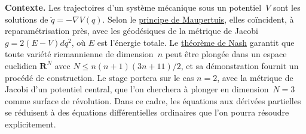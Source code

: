 \documentclass[a4paper,11pt]{article}
\begin{document}
{\bf Contexte.}
Les trajectoires d’un système mécanique sous un potentiel~$V$ sont les
solutions de $\ddot q = -\nabla V(q)$.  Selon le \underline{principe de
Maupertuis}, elles coïncident, à reparamétrisation près, avec les géodésiques
de la métrique de Jacobi $g = 2(E-V)dq^2$, où $E$ est l'énergie totale.
Le \underline{théorème de Nash} garantit que toute variété riemannienne de dimension~$n$
peut être plongée dans un espace euclidien $\mathbf{R}^N$ avec $N \le
{n(n+1)(3n+11)}/{2}$, et sa démonstration fournit un procédé de
construction.
Le stage portera sur le cas $n=2$, avec la métrique de Jacobi d’un potentiel
central, que l’on cherchera à plonger en dimension~$N=3$ comme surface de
révolution. Dans ce cadre, les équations aux dérivées partielles se réduisent à
des équations différentielles ordinaires que l’on pourra résoudre
explicitement.
\end{document}
